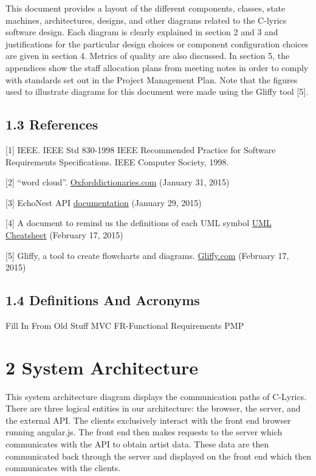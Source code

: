 \documentclass[]{article}
\begin{document}
This document provides a layout of the different components, classes,
state machines, architectures, designs, and other diagrams related to
the C-lyrics software design. Each diagram is clearly explained in
section 2 and 3 and justifications for the particular design choices or
component configuration choices are given in section 4. Metrics of
quality are also discussed. In section 5, the appendices show the staff
allocation plans from meeting notes in order to comply with standards
set out in the Project Management Plan. Note that the figures used to
illustrate diagrams for this document were made using the Gliffy tool
{[}5{]}.

\subsection{1.3 References}\label{references}

{[}1{]} IEEE. IEEE Std 830-1998 IEEE Recommended Practice for Software
Requirements Specifications. IEEE Computer Society, 1998.

{[}2{]} ``word cloud''.
\href{http://www.oxforddictionaries.com/us/definition/american_english/word-cloud}{Oxforddictionaries.com}
(January 31, 2015)

{[}3{]} EchoNest API
\href{http://developer.echonest.com/docs/v4/index.html\#overview}{documentation}
(January 29, 2015)

{[}4{]} A document to remind us the definitions of each UML symbol
\href{http://loufranco.com/wp-content/uploads/2012/11/cheatsheet.pdf}{UML
Cheatsheet} (February 17, 2015)

{[}5{]} Gliffy, a tool to create flowcharts and diagrams.
\href{https://www.gliffy.com}{Gliffy.com} (February 17, 2015)

\subsection{1.4 Definitions And
Acronyms}\label{definitions-and-acronyms}

Fill In From Old Stuff MVC FR-Functional Requirements PMP

\section{2 System Architecture}\label{system-architecture}

This system architecture diagram displays the communication paths of
C-Lyrics. There are three logical entities in our architecture: the
browser, the server, and the external API. The clients exclusively
interact with the front end browser running angular.js. The front end
then makes requests to the server which communicates with the API to
obtain artist data. These data are then communicated back through the
server and displayed on the front end which then communicates with the
clients.
\end{document}
